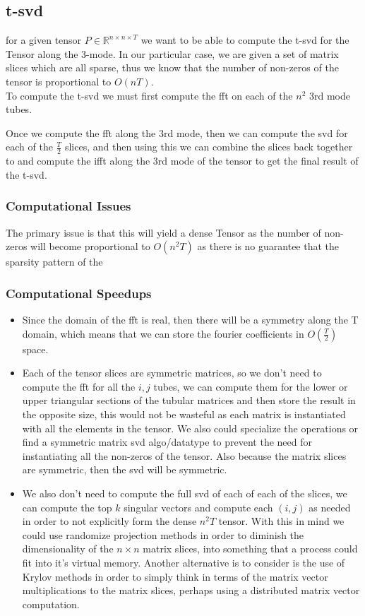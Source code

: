 \documentclass{report}
\begin{document}
	  \subsection{t-svd}
	    for a given tensor $ P \in \mathbb{R}^{n \times n \times T} $ we want to be able to compute the t-svd for the Tensor along the 3-mode. In our particular case, we are given a set of matrix slices which are all sparse, thus we know that the number of non-zeros of the tensor is proportional to $ O(nT) $. \\
	    To compute the t-svd we must first compute the fft on each of the $ n^2 $ 3rd mode tubes. 
	    
	    Once we compute the fft along the 3rd mode, then we can compute the svd for each of the $ \frac{T}{2} $ slices, and then using this we can combine the slices back together to and compute the ifft along the 3rd mode of the tensor to get the final result of the t-svd.
	    \subsubsection{Computational Issues}
	    The primary issue is that this will yield a dense Tensor as the number of non-zeros will become proportional to $ O(n^2T) $ as there is no guarantee that the sparsity pattern of the 
	    
	    \subsubsection{Computational Speedups}
	    \begin{itemize}
	    	\item Since the domain of the fft is real, then there will be a symmetry along the T domain, which means that we can store the fourier coefficients in $ O(\frac{T}{2}) $ space.
	    	
	    	\item Each of the tensor slices are symmetric matrices, so we don't need to compute the fft for all the $ i,j $ tubes, we can compute them for the lower or upper triangular sections of the tubular matrices and then store the result in the opposite size, this would not be wasteful as each matrix is instantiated with all the elements in the tensor. We also could specialize the operations or find a symmetric matrix svd algo/datatype to prevent the need for instantiating all the non-zeros of the tensor. Also because the matrix slices are symmetric, then the svd will be symmetric. 
	    	
	    	\item We also don't need to compute the full svd of each of each of the slices, we can compute the top $ k $ singular vectors and compute each $ (i,j) $ as needed in order to not explicitly form the dense $ n^2T $ tensor. With this in mind we could use randomize projection methods in order to diminish the dimensionality of the $ n \times n $ matrix slices, into something that a process could fit into it's virtual memory. 
	    	Another alternative is to consider is the use of Krylov methods in order to simply think in terms of the matrix vector multiplications to the matrix slices, perhaps using a distributed matrix vector computation.
	    \end{itemize}
	    
\end{document}
